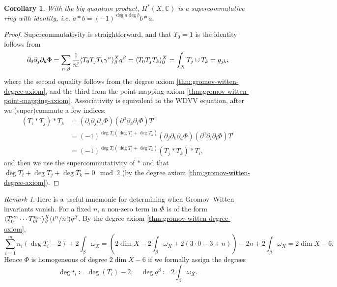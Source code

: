 \documentclass{report}
\theoremstyle{plain}
\newtheorem{corollary}[theorem]{Corollary}
\theoremstyle{definition}
\theoremstyle{remark}
\newtheorem*{remark}{Remark}
\newcommand{\di}{\partial}
\newcommand{\bC}{\mathbb{C}}
\DeclarePairedDelimiter{\inner}{\langle}{\rangle}
\begin{document}
\begin{corollary}
  With the big quantum product, $H^*(X, \bC)$ is a supercommutative
  ring with identity, i.e. $a * b = (-1)^{\deg a \deg b} b * a$.
\end{corollary}

\begin{proof}
  Supercommutativity is straightforward, and that $T_0 = 1$ is the
  identity follows from
  \[ \di_0 \di_j \di_k \Phi = \sum_{n,\beta} \frac{1}{n!} \inner{T_0T_jT_k\gamma^n}_\beta^X q^\beta = \inner{T_0T_jT_k}_0^X = \int_X T_j \cup T_k = g_{jk}, \]
  where the second equality follows from the degree axiom
  \ref{thm:gromov-witten-degree-axiom}, and the third from the point
  mapping axiom \ref{thm:gromov-witten-point-mapping-axiom}.
  Associativity is equivalent to the WDVV equation, after we
  (super)commute a few indices:
  \begin{align*}
    (T_i * T_j) * T_k
    &= (\di_i \di_j \di_a \Phi) (\di^a \di_k \di_l \Phi) T^l \\
    &= (-1)^{\deg T_i (\deg T_j + \deg T_k)} (\di_j \di_k \di_a \Phi) (\di^a \di_i \di_l \Phi) T^l \\
    &= (-1)^{\deg T_i(\deg T_j + \deg T_k)} (T_j * T_k) * T_i,
  \end{align*}
  and then we use the supercommutativity of $*$ and that $\deg T_i +
  \deg T_j + \deg T_k \equiv 0 \mod 2$ (by the degree axiom
  \ref{thm:gromov-witten-degree-axiom}).
\end{proof}

\begin{remark}
  Here is a useful mnemonic for determining when Gromov--Witten
  invariants vanish. For a fixed $n$, a non-zero term in $\Phi$ is of
  the form $\inner{T_0^{n_0}\cdots T_m^{n_m}}_\beta^X (t^n/n!)
  q^\beta$. By the degree axiom \ref{thm:gromov-witten-degree-axiom},
  \[ \sum_{i=1}^m n_i(\deg T_i - 2) + 2\int_\beta \omega_X = \left(2\dim X - 2\int_\beta \omega_X + 2(3 \cdot 0 - 3 + n)\right) - 2n + 2\int_\beta \omega_X = 2 \dim X - 6. \]
  Hence $\Phi$ is homogeneous of degree $2\dim X - 6$ if we formally
  assign the degrees
  \begin{equation} \label{eq:gromov-witten-potential-formal-degrees}
    \deg t_i \coloneqq \deg(T_i) - 2, \quad \deg q^\beta \coloneqq 2\int_\beta \omega_X.
  \end{equation}
\end{remark}
\end{document}
